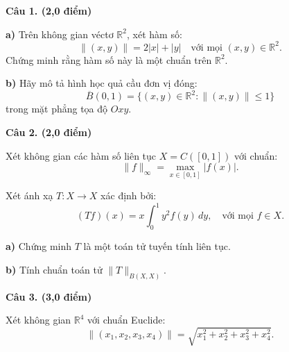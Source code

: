 \vspace{1cm}


\noindent\textbf{\large Câu 1. (2,0 điểm)}

\vspace{0.3cm}

\textbf{a)} Trên không gian véctơ $\mathbb{R}^2$, xét hàm số:
\[
    \|(x, y)\| = 2|x| + |y| \quad \text{với mọi } (x, y) \in \mathbb{R}^2.
\]
Chứng minh rằng hàm số này là một chuẩn trên $\mathbb{R}^2$.

\vspace{0.4cm}

\textbf{b)} Hãy mô tả hình học quả cầu đơn vị đóng:
\[
    \overline{B}(0, 1) = \{ (x, y) \in \mathbb{R}^2 : \|(x, y)\| \leq 1 \}
\]
trong mặt phẳng tọa độ $Oxy$.

\vspace{0.6cm}
\noindent\textbf{\large Câu 2. (2,0 điểm)}

\vspace{0.3cm}

Xét không gian các hàm số liên tục $X = C([0, 1])$ với chuẩn:
\[
    \|f\|_\infty = \max_{x \in [0, 1]} |f(x)|.
\]

Xét ánh xạ $T : X \to X$ xác định bởi:
\[
    (Tf)(x) = x \int_0^1 y^2 f(y) \, dy, \quad \text{với mọi } f \in X.
\]

\textbf{a)} Chứng minh $T$ là một toán tử tuyến tính liên tục.

\vspace{0.3cm}

\textbf{b)} Tính chuẩn toán tử $\|T\|_{B(X, X)}$.

\vspace{0.6cm}
\noindent\textbf{\large Câu 3. (3,0 điểm)}

\vspace{0.3cm}

Xét không gian $\mathbb{R}^4$ với chuẩn Euclide:
\[
    \|(x_1, x_2, x_3, x_4)\| = \sqrt{x_1^2 + x_2^2 + x_3^2 + x_4^2}.
\]

